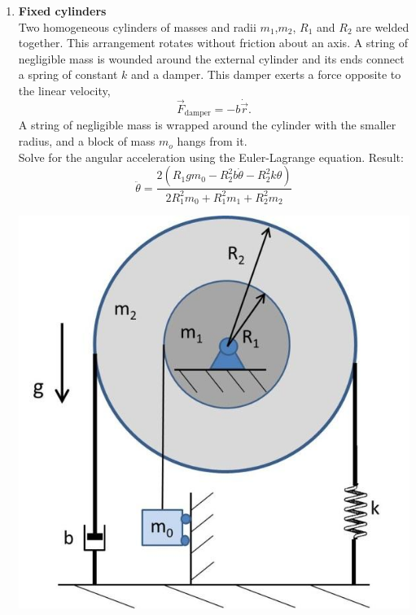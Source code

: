 \documentclass[11pt, a4paper, twoside]{article}
\begin{document}
\begin{enumerate}
\item
\begin{minipage}[t][8cm]{0.6\textwidth}
\textbf{Fixed cylinders}\\
Two homogeneous cylinders of masses and radii $m_1$,$m_2$, $R_1$ and $R_2$ are welded together.
This arrangement rotates without friction about an axis.
A string of negligible mass is wounded around the external cylinder and its ends connect a spring of constant $k$ and a damper.
This damper exerts a force opposite to the linear velocity,
$$
\vec{F}_\mathrm{damper} = - b \dot{\vec{r}}.
$$
A string of negligible mass is wrapped around the cylinder with the smaller radius, and a block of mass $m_o$ hangs from it.\\
Solve for the angular acceleration using the Euler-Lagrange equation. 
Result:\\
\[
	\ddot{\theta} = \frac{2 \left(R_{1} g m_{0} - R_{2}^{2} b \dot{\theta} - R_{2}^{2} k \theta\right)}{2 R_{1}^{2} m_{0} + R_{1}^{2} m_{1} + R_{2}^{2} m_{2}}
\]
\end{minipage}
\begin{minipage}[c][0cm][t]{0.35\textwidth}
	\includegraphics[width=\textwidth]{figures/pset7ex4}
\end{minipage}




\end{enumerate}
\end{document}
